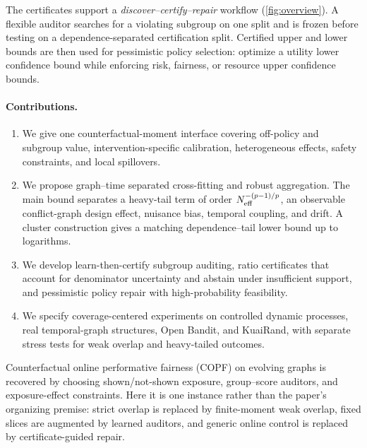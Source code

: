 The certificates support a \emph{discover--certify--repair} workflow (\cref{fig:overview}). A flexible auditor searches for a violating subgroup on one split and is frozen before testing on a dependence-separated certification split. Certified upper and lower bounds are then used for pessimistic policy selection: optimize a utility lower confidence bound while enforcing risk, fairness, or resource upper confidence bounds.

\paragraph{Contributions.}
\begin{enumerate}[leftmargin=1.35em,itemsep=1pt,topsep=2pt]
    \item We give one counterfactual-moment interface covering off-policy and subgroup value, intervention-specific calibration, heterogeneous effects, safety constraints, and local spillovers.
    \item We propose graph--time separated cross-fitting and robust aggregation. The main bound separates a heavy-tail term of order $N_{\mathrm{eff}}^{-(p-1)/p}$, an observable conflict-graph design effect, nuisance bias, temporal coupling, and drift. A cluster construction gives a matching dependence--tail lower bound up to logarithms.
    \item We develop learn-then-certify subgroup auditing, ratio certificates that account for denominator uncertainty and abstain under insufficient support, and pessimistic policy repair with high-probability feasibility.
    \item We specify coverage-centered experiments on controlled dynamic processes, real temporal-graph structures, Open Bandit, and KuaiRand, with separate stress tests for weak overlap and heavy-tailed outcomes.
\end{enumerate}

Counterfactual online performative fairness (COPF) on evolving graphs \citep{li2026copf} is recovered by choosing shown/not-shown exposure, group--score auditors, and exposure-effect constraints. Here it is one instance rather than the paper's organizing premise: strict overlap is replaced by finite-moment weak overlap, fixed slices are augmented by learned auditors, and generic online control is replaced by certificate-guided repair.
